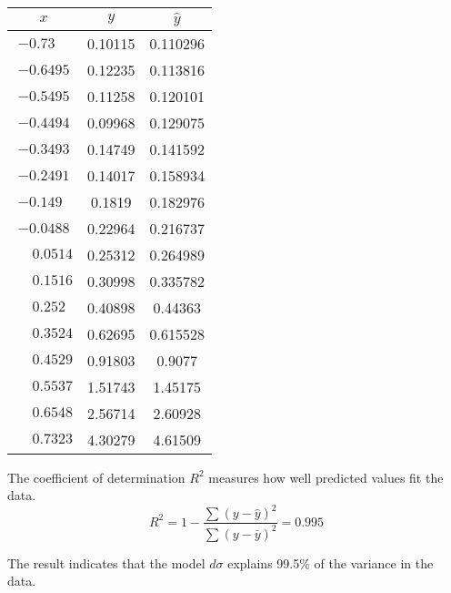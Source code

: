 \documentclass[12pt]{article}
\begin{document}
\begin{center}
\begin{tabular}{|c|c|c|}
\hline
$x$ & $y$ & $\hat{y}$\\
\hline
$-0.73\phantom{00}$ & 0.10115 & 0.110296\\
$-0.6495$ & 0.12235 & 0.113816\\
$-0.5495$ & 0.11258 & 0.120101\\
$-0.4494$ & 0.09968 & 0.129075\\
$-0.3493$ & 0.14749 & 0.141592\\
$-0.2491$ & 0.14017 & 0.158934\\
$-0.149\phantom{0}$ & 0.1819\phantom{0} & 0.182976\\
$-0.0488$ & 0.22964 & 0.216737\\
$\phantom{+}0.0514$ & 0.25312 & 0.264989\\
$\phantom{+}0.1516$ & 0.30998 & 0.335782\\
$\phantom{+}0.252\phantom{0}$ & 0.40898 & 0.44363\phantom{0}\\
$\phantom{+}0.3524$ & 0.62695 & 0.615528\\
$\phantom{+}0.4529$ & 0.91803 & 0.9077\phantom{00}\\
$\phantom{+}0.5537$ & 1.51743 & 1.45175\phantom{0}\\
$\phantom{+}0.6548$ & 2.56714 & 2.60928\phantom{0}\\
$\phantom{+}0.7323$ & 4.30279 & 4.61509\phantom{0}\\
\hline
\end{tabular}
\end{center}

The coefficient of determination $R^2$ measures how well predicted values fit the data.
\begin{equation*}
R^2=1-\frac{\sum(y-\hat{y})^2}{\sum(y-\bar{y})^2}=0.995
\end{equation*}

The result indicates that the model $d\sigma$ explains 99.5\% of the variance in the data.
\end{document}
